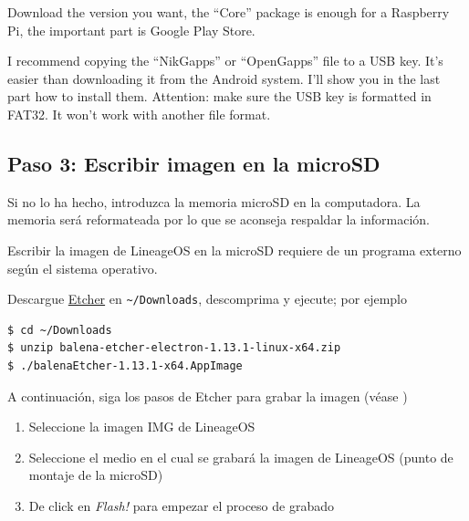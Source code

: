 \documentclass[letterpaper,10.5pt]{article}
\begin{document}
    Download the version you want, the “Core” package is enough for a Raspberry Pi, the important part is Google Play Store.

I recommend copying the “NikGapps” or “OpenGapps” file to a USB key.
It’s easier than downloading it from the Android system. I’ll show you in the last part how to install them. Attention: make sure the USB key is formatted in FAT32. It won’t work with another file format.


%
%
\subsection{Paso 3: Escribir imagen en la microSD}%
\label{sec:step2}
Si no lo ha hecho, introduzca la memoria microSD en la computadora.
La memoria será reformateada por lo que se aconseja respaldar la información.

Escribir la imagen de LineageOS en la microSD requiere de un programa externo según el sistema operativo.

%
%
Descargue \href{https://etcher.io/}{Etcher} en \texttt{\textasciitilde/Downloads}, descomprima y ejecute; por ejemplo

\begin{Verbatim}[fontsize=\footnotesize]
$ cd ~/Downloads
$ unzip balena-etcher-electron-1.13.1-linux-x64.zip
$ ./balenaEtcher-1.13.1-x64.AppImage
\end{Verbatim}


A continuación, siga los pasos de Etcher para grabar la imagen (véase )
\begin{enumerate}[noitemsep]
	\item Seleccione la imagen IMG de LineageOS
	\item Seleccione el medio en el cual se grabará la imagen de LineageOS (punto de montaje de la microSD)
	\item De click en \emph{Flash!} para empezar el proceso de grabado
\end{enumerate}
\end{document}
